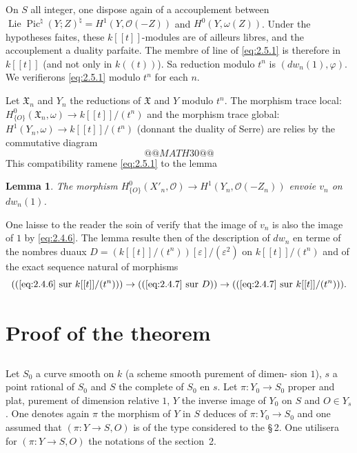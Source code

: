 \documentclass[12pt,a4paper]{article}
\theoremstyle{plain}
\newtheorem{lemma}{Lemma}
\theoremstyle{definition}
\theoremstyle{remark}
\DeclareMathOperator{\Lie}{Lie}
\DeclareMathOperator{\Pic}{Pic}
\newcommand{\OO}{\mathcal{O}}
\providecommand{\Lie}{\operatorname{Lie}}
\begin{document}
On $S$ all integer, one dispose again of a accouplement between
$\Lie\Pic^\natural(Y;Z)^\natural=H^1(Y,\OO(-Z))$ and $H^0(Y,\omega(Z))$. Under the hypotheses
faites, these $k[[t]]$-modules are of ailleurs libres, and the accouplement a duality parfaite.
The membre of line of \eqref{eq:2.5.1} is therefore in $k[[t]]$ (and not only in
$k((t))$). Sa reduction modulo $t^n$ is $(dw_n(1),\varphi)$. We verifierons
\eqref{eq:2.5.1} modulo $t^n$ for each $n$.

Let $\mathfrak{X}_n$ and $Y_n$ the reductions of $\mathfrak{X}$ and $Y$ modulo $t^n$. The morphism trace
local: $H^0_{\{O\}}(\mathfrak{X}_n,\omega)\to k[[t]]/(t^n)$ and the morphism trace global:
$H^1(Y_n,\omega)\to k[[t]]/(t^n)$ (donnant the duality of Serre) are relies by the
commutative diagram
\[
@@MATH30@@
\]
This compatibility ramene \eqref{eq:2.5.1} to the lemma

\begin{lemma}\label{lem:2.6}
The morphism $H^0_{\{O\}}(X'_n,\OO)\to H^1(Y_n,\OO(-Z_n))$
envoie $v_n$ on $dw_n(1)$.
\end{lemma}

One laisse to the reader the soin of verify that the image of $v_n$ is also the image of
$1$ by \eqref{eq:2.4.6}. The lemma resulte then of the description of $dw_n$ en terme of the
nombres duaux $D=(k[[t]]/(t^n))[\varepsilon]/(\varepsilon^2)$ on $k[[t]]/(t^n)$ and of the exact sequence natural
of morphisms
\[
((\eqref{eq:2.4.6}\text{ sur }k[[t]]/(t^n)))\to((\eqref{eq:2.4.7}\text{ sur }D))\to((\eqref{eq:2.4.7}\text{ sur }k[[t]]/(t^n))).
\]

\section{Proof of the theorem}

\subsection{}\label{sec:3.1}

Let $S_0$ a curve smooth on $k$ (a scheme smooth purement of dimen-
sion $1$), $s$ a point rational of $S_0$ and $S$ the complete of $S_0$ en $s$. Let
$\pi:Y_0\to S_0$ proper and plat, purement of dimension relative $1$, $Y$ the inverse image
of $Y_0$ on $S$ and $O\in Y_s$. One denotes again $\pi$ the morphism of $Y$ in $S$ deduces of
$\pi:Y_0\to S_0$ and one assumed that $(\pi:Y\to S,O)$ is of the type considered to the \S\,2.
One utilisera for $(\pi:Y\to S,O)$ the notations of the section~2.
\end{document}

